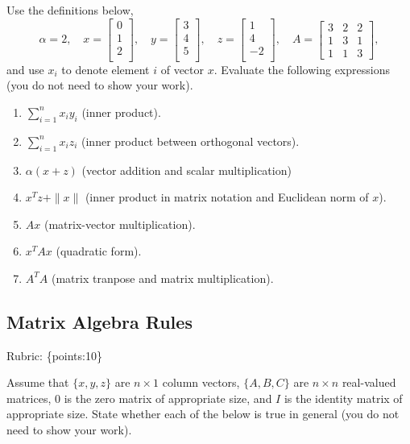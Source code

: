 \documentclass{article}
\def\rubric#1{\gre{Rubric: \{#1\}}}{}
\def\blu#1{{\color{blu}#1}}
\def\gre#1{{\color{gre}#1}}
\def\norm#1{\|#1\|}
\begin{document}
	Use the definitions below,
	\[
	\alpha = 2,\quad
	x = \left[\begin{array}{c}
		0\\
		1\\
		2\\
	\end{array}\right], \quad
	y = \left[\begin{array}{c}
		3\\
		4\\
		5\\
	\end{array}\right],\quad
	z = \left[\begin{array}{c}
		1\\
		4\\
		-2\\
	\end{array}\right],\quad
	A = \left[\begin{array}{ccc}
		3 & 2 & 2\\
		1 & 3 & 1\\
		1 & 1 & 3
	\end{array}\right],
	\]
	and use $x_i$ to denote element $i$ of vector $x$.
	\blu{Evaluate the following expressions} (you do not need to show your work).
	\begin{enumerate}
		\item $\sum_{i=1}^n x_iy_i$ (inner product).
		\item $\sum_{i=1}^n x_i z_i$ (inner product between orthogonal vectors).
		\item $\alpha(x+z)$ (vector addition and scalar multiplication)
		\item $x^Tz + \norm{x}$ (inner product in matrix notation and Euclidean norm of $x$).
		\item $Ax$ (matrix-vector multiplication).
		\item $x^TAx$ (quadratic form).
		\item $A^TA$ (matrix tranpose and matrix multiplication).
	\end{enumerate}

	\subsection{Matrix Algebra Rules}
	\rubric{points:10}

	Assume that $\{x,y,z\}$ are $n \times 1$ column vectors, $\{A,B,C\}$ are $n \times n$ real-valued matrices, $0$ is the zero matrix of appropriate size, and $I$ is the identity matrix of appropriate size. \blu{State whether each of the below is true in general} (you do not need to show your work).
\end{document}
